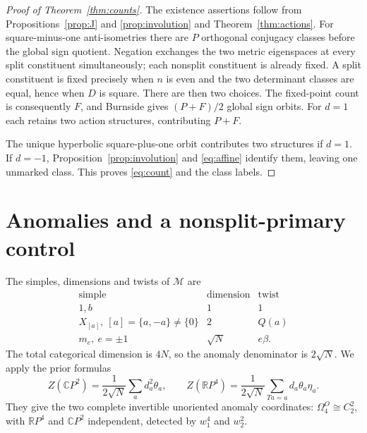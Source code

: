 \documentclass{amsart}
\theoremstyle{definition}\newtheorem{definition}[theorem]{Definition}
\theoremstyle{remark}\newtheorem{remark}[theorem]{Remark}
\newcommand{\C}{\mathbb C}\newcommand{\F}{\mathbb F}
\newcommand{\M}{\mathcal M}\newcommand{\D}{\mathcal D}
\begin{document}
\begin{proof}[Proof of Theorem~\ref{thm:counts}]
The existence assertions follow from Propositions~\ref{prop:J}
and \ref{prop:involution} and Theorem~\ref{thm:actions}.
For square-minus-one anti-isometries there are $P$ orthogonal
conjugacy classes before the global sign quotient. Negation exchanges
the two metric eigenspaces at every split constituent simultaneously;
each nonsplit constituent is already fixed. A split constituent is
fixed precisely when $n$ is even and the two determinant classes
are equal, hence when $D$ is square. There are then two choices.
The fixed-point count is consequently $F$, and Burnside gives
$(P+F)/2$ global sign orbits. For $d=1$ each retains two action
structures, contributing $P+F$.

The unique hyperbolic square-plus-one orbit contributes two
structures if $d=1$. If $d=-1$, Proposition~\ref{prop:involution}
and \eqref{eq:affine} identify them, leaving one unmarked class.
This proves \eqref{eq:count} and the class labels.
\end{proof}

\section{Anomalies and a nonsplit-primary control}

The simples, dimensions and twists of $\M$ are
\[
\begin{array}{c|c|c}
\text{simple}&\text{dimension}&\text{twist}\\ \hline
1,b&1&1\\
X_{[a]},\ [a]=\{a,-a\}\ne\{0\}&2&Q(a)\\
m_e,\ e=\pm1&\sqrt N&e\beta.
\end{array}
\]
The total categorical dimension is $4N$, so the anomaly denominator
is $2\sqrt N$. We apply the prior formulas
\cite[(184), (191), and (12)]{BBCJW}
\begin{equation}\label{eq:indicators}
 Z(\C P^2)=\frac1{2\sqrt N}\sum_a d_a^2\theta_a,\qquad
 Z(\mathbb R P^4)=\frac1{2\sqrt N}\sum_{Ta=a}d_a\theta_a\eta_a.
\end{equation}
They give the two complete invertible unoriented anomaly coordinates:
$\Omega_4^O\cong C_2^2$, with $\mathbb R P^4$ and $\C P^2$
independent, detected by $w_1^4$ and $w_2^2$.
\end{document}
